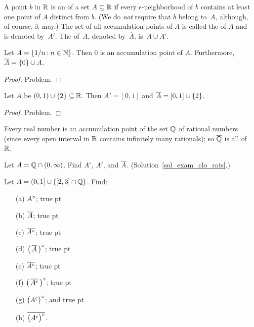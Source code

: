 \begin{defn}A point $b$ in $\mathbb{R}$ is an
 of a set $A \subseteq \mathbb{R}$ if every $\epsilon$-neighborhood of $b$
contains at least one point of $A$ distinct from $b$.  (We do \emph{not} require that $b$
belong to~$A$, although, of course, it may.)  The set of all accumulation points of $A$ is
called the
 of $A$ and is denoted
by~$A'$.  The
 of~$A$, denoted
by~$\overline A$, is~$A \cup A'$.
\end{defn}

\begin{exam} Let $A = \{1/n\colon n \in \mathbb{N}\}$.  Then $0$ is an accumulation point of $A$.
Furthermore, $\overline{A} = \{0\} \cup A$.
\end{exam}

\begin{proof} Problem.
\ns  \end{proof}

\begin{exam} Let $A$ be $(0,1) \cup \{2\} \subseteq \mathbb{R}$. Then $A' = [0,1]$ and $\overline{A} =
[0,1] \cup \{2\}$.
\end{exam}

\begin{proof} Problem. \ns \end{proof}

\begin{exam}\label{q_dense} Every real number is an accumulation point of the set $\mathbb{Q}$ of
rational numbers (since every open interval in $\mathbb{R}$ contains infinitely many rationals); so
$\overline{\mathbb{Q}}$ is all of~$\mathbb{R}$.
\end{exam}

\begin{exer}\label{exam_clo_rats} Let $A = \mathbb{Q} \cap (0,\infty)$.  Find $A^\circ$, $A'$, and
$\overline{A}$. (Solution~\ref{sol_exam_clo_rats}.)
\end{exer}

\begin{prob} Let $A = (0,1] \cup \bigl([2,3] \cap \mathbb{Q} \bigr)$. Find:
 \begin{enumerate}
   \item[(a)] $A^{\circ}$;
 true pt
   \item[(b)] $\overline{A}$;
 true pt
   \item[(c)] $\overline{A^{\circ}}$;
 true pt
   \item[(d)] $\bigl(\,\overline{A}\,\bigr)^{\circ}$;
 true pt
   \item[(e)] $\overline{A^c}$;
 true pt
   \item[(f)] $\left(\,\overline{A^c}\,\right)^{\circ}$;
 true pt
   \item[(g)] $\bigl(A^c\bigr)^{\circ}$; and
 true pt
   \item[(h)] $\overline{\bigl(A^c\bigr)^{\circ}}$.
 \end{enumerate}
\end{prob}

